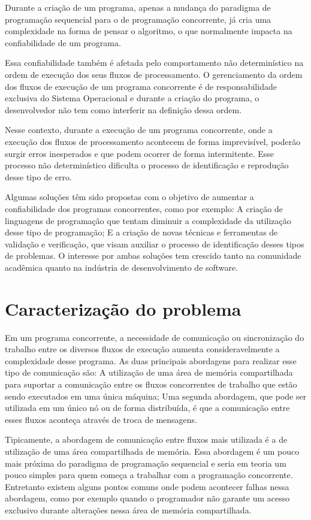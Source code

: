 Durante a criação de um programa, apenas a mudança do paradigma de programação sequencial para o de programação concorrente, já cria uma complexidade na forma de pensar o algoritmo, o que normalmente impacta na confiabilidade de um programa.

 Essa confiabilidade também é afetada pelo comportamento não determinístico na ordem de execução dos seus fluxos de processamento. O gerenciamento da ordem dos fluxos de execução de um programa concorrente é de responsabilidade exclusiva do Sistema Operacional e durante a criação do programa, o desenvolvedor não tem como interferir na definição dessa ordem. 

Nesse contexto, durante a execução de um programa concorrente, onde a execução dos fluxos de processamento acontecem de forma imprevisível, poderão surgir erros inesperados e que podem ocorrer de forma intermitente. Esse processo não determinístico dificulta o processo de identificação e reprodução desse tipo de erro. 

Algumas soluções têm sido propostas com o objetivo de aumentar a confiabilidade dos programas concorrentes, como por exemplo: A criação de linguagens de programação que tentam diminuir a complexidade da utilização desse tipo de programação; E a criação de novas técnicas e ferramentas de validação e verificação, que visam auxiliar o processo de identificação desses tipos de problemas. O interesse por ambas soluções tem  crescido tanto na comunidade acadêmica quanto na indústria de desenvolvimento de software.

\section{Caracterização do problema}

Em um programa concorrente, a necessidade de comunicação ou sincronização do trabalho entre os diversos fluxos de execução aumenta consideravelmente a complexidade desse programa. As duas principais abordagens para realizar esse tipo de comunicação são: A utilização de uma área de memória compartilhada para suportar a comunicação entre os fluxos concorrentes de trabalho que estão sendo executados em uma única máquina; Uma segunda abordagem, que pode ser utilizada em um único nó ou de forma distribuída, é que a comunicação entre esses fluxos aconteça através de troca de mensagens.

Tipicamente, a abordagem de comunicação entre fluxos mais utilizada é a de utilização de uma área compartilhada de memória. Essa abordagem é um pouco mais próxima do paradigma de programação sequencial e seria em teoria um pouco simples para quem começa a trabalhar com a programação concorrente. Entretanto existem alguns pontos comuns onde podem acontecer falhas nessa abordagem, como por exemplo quando o programador não garante um acesso exclusivo durante alterações nessa área de memória compartilhada.

